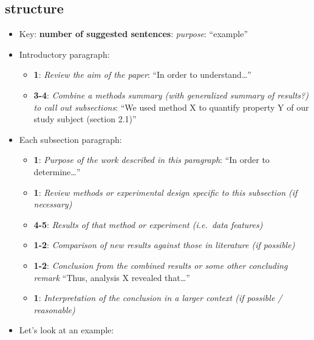 \documentclass[
]{krantz}
\providecommand{\tightlist}{%
  \setlength{\itemsep}{0pt}\setlength{\parskip}{0pt}}
\begin{document}
\hypertarget{structure}{%
\subsection{structure}\label{structure}}

\begin{itemize}
\item
  Key: \textbf{number of suggested sentences}: \emph{purpose}: ``example''
\item
  Introductory paragraph:

  \begin{itemize}
  \tightlist
  \item
    \textbf{1}: \emph{Review the aim of the paper}: ``In order to understand\ldots{}''
  \item
    \textbf{3-4}: \emph{Combine a methods summary (with generalized summary of results?) to call out subsections}: ``We used method X to quantify property Y of our study subject (section 2.1)''
  \end{itemize}
\item
  Each subsection paragraph:

  \begin{itemize}
  \tightlist
  \item
    \textbf{1}: \emph{Purpose of the work described in this paragraph}: ``In order to determine\ldots{}''
  \item
    \textbf{1}: \emph{Review methods or experimental design specific to this subsection (if necessary)}
  \item
    \textbf{4-5}: \emph{Results of that method or experiment (i.e.~data features)}
  \item
    \textbf{1-2}: \emph{Comparison of new results against those in literature (if possible)}
  \item
    \textbf{1-2}: \emph{Conclusion from the combined results or some other concluding remark} ``Thus, analysis X revealed that\ldots{}''
  \item
    \textbf{1}: \emph{Interpretation of the conclusion in a larger context (if possible / reasonable)}
  \end{itemize}
\item
  Let's look at an example:
\end{itemize}
\end{document}
